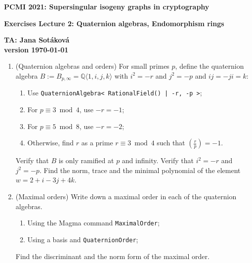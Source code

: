 \documentclass[12pt]{report}
\newcommand{\Q}{\mathbb{Q}}
\begin{document}
\thispagestyle{empty}

\sloppy
\centerline{\Large\bf PCMI 2021: Supersingular isogeny graphs in cryptography } 

\vspace{4mm}
\centerline{\Large\bf Exercises Lecture 2: Quaternion algebras, Endomorphism rings} 
\vspace{4mm}
\centerline{\bf TA: Jana Sot\'{a}kov\'{a}  \\  version \today }

\smallskip

\begin{enumerate}
\item (Quaternion algebras and orders) For small primes $p $, define the quaternion algebra $B := B_{p, \infty} = \Q\langle 1, i, j, k\rangle $ with $i^2 = -r $ and $j^2 = -p$ and $ij=-ji =k$: 
\begin{enumerate}
\item Use \verb=QuaternionAlgebra< RationalField() | -r, -p >=;
\item For $p \equiv 3 \bmod 4$, use $-r = -1$;
\item For $p \equiv 5 \bmod 8$, use $-r = -2$;
\item Otherwise, find $r$ as a prime $r\equiv 3 \bmod 4$ such that $\left( \frac{r}{p} \right) = -1$. 
\end{enumerate}

Verify that $B$ is only ramified at $p$ and infinity. Verify that $i^2 =-r$ and $j^2 = -p$. Find the norm, trace and the minimal polynomial of the element $w = 2+i-3j + 4k$.


\item (Maximal orders) Write down a maximal order in each of the quaternion algebras.
\begin{enumerate}
\item Using the Magma command \verb=MaximalOrder=; 
\item Using a basis and \verb=QuaternionOrder=;
\end{enumerate}

Find the discriminant and the norm form of the maximal order.


\end{enumerate}
\end{document}
